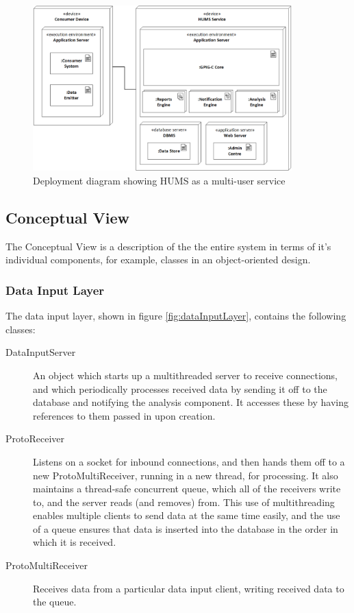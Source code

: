\documentclass[10pt,a4paper]{article}
\begin{document}
\begin{figure}[!ht]
  \centering
  \includegraphics[width=10cm]{images/DeploymentService.png}
  \caption{Deployment diagram showing HUMS as a multi-user service}
  \label{fig:DeploymentService}
\end{figure}

\subsection{Conceptual View}
The Conceptual View is a description of the the entire system in terms of it's individual components, for example, classes in an object-oriented design.

\subsubsection{Data Input Layer}

The data input layer, shown in figure \ref{fig:dataInputLayer},
contains the following classes:

\begin{description}
  \item[DataInputServer] An object which starts up a multithreaded
    server to receive connections, and which periodically processes
    received data by sending it off to the database and notifying the
    analysis component. It accesses these by having references to them
    passed in upon creation.

  \item[ProtoReceiver] Listens on a socket for inbound connections,
    and then hands them off to a new ProtoMultiReceiver, running in a
    new thread, for processing. It also maintains a thread-safe
    concurrent queue, which all of the receivers write to, and the
    server reads (and removes) from. This use of multithreading
    enables multiple clients to send data at the same time easily, and
    the use of a queue ensures that data is inserted into the database
    in the order in which it is received.

  \item[ProtoMultiReceiver] Receives data from a particular data input
    client, writing received data to the queue.
\end{description}
\end{document}
